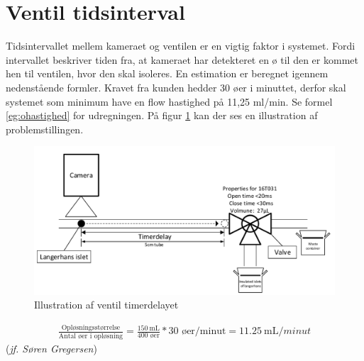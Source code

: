 
\newpage
 \section{Ventil tidsinterval}
Tidsintervallet mellem kameraet og ventilen er en vigtig faktor i systemet. Fordi intervallet beskriver tiden fra, at kameraet har detekteret en ø til den er kommet hen til ventilen, hvor den skal isoleres. En estimation er beregnet igennem nedenstående formler. Kravet fra kunden hedder 30 øer i minuttet, derfor skal systemet som minimum have en flow hastighed på 11,25 ml/min. Se formel \ref{eg:ohastighed} for udregningen. På figur \ref{fig:tidsintervalventil} kan der ses en illustration af problemstillingen.

\begin{figure}[H]
	\centering
	\includegraphics[width=1\textwidth]{billeder/Hovedrapport/tidsinterval.pdf}
	\caption{Illustration af ventil timerdelayet}
	\label{fig:tidsintervalventil}
\end{figure}

\begin{align}
\frac{\text{Opløsningsstørrelse}}{\text{Antal øer i opløsning}} = \frac{\SI{150}{\milli\liter}}{400\text{ øer}}*30\text{ øer/minut} = \SI{11,25}{\milli\liter/minut} 
\label{eg:ohastighed}
\end{align}(\textit{jf. Søren Gregersen})

